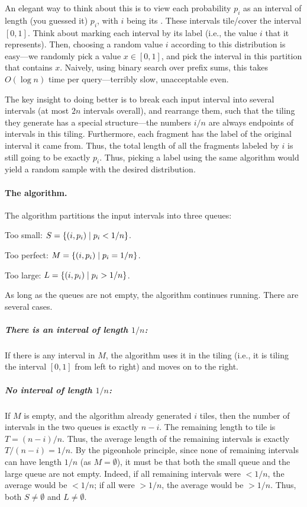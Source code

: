 An elegant way to think about this is to view each probability $p_i$ as
an interval of length (you guessed it) $p_i$, with $i$ being its
.  These intervals tile/cover the interval $[0,1]$. Think
about marking each interval by its label (i.e., the value $i$ that it
represents). Then, choosing a random value $i$ according to this
distribution is easy---we randomly pick a value $x \in [0,1]$, and pick the
interval in this partition that contains $x$. Naively, using binary
search over prefix sums, this takes $O( \log n)$ time per query---terribly
slow, unacceptable even.

The key insight to doing better is to break each input interval into
several intervals (at most $2n$ intervals overall), and rearrange them,
such that the tiling they generate has a special structure---the numbers
$i/n$ are always endpoints of intervals in this tiling. Furthermore, each
fragment has the label of the original interval it came from. Thus, the
total length of all the fragments labeled by $i$ is still going to be
exactly $p_i$. Thus, picking a label using the same algorithm would yield
a random sample with the desired distribution.

\paragraph*{The algorithm.}

The algorithm partitions the input intervals into three queues:
\smallskip
\begin{compactenumI}
    \item Too small: $S = \left\{ (i,p_i) \;\middle\vert\;  p_i < 1/n \right\}$.

    \smallskip%
    \item Too perfect: $M = \left\{ (i,p_i) \;\middle\vert\;  p_i = 1/n \right\}$.

    \smallskip%
    \item Too large: $L = \left\{ (i,p_i) \;\middle\vert\;  p_i > 1/n \right\}$.
\end{compactenumI}
\medskip%

As long as the queues are not empty, the algorithm continues running.
There are several cases.  \subparagraph*{There is an interval of length
   $1/n$:} If there is any interval in $M$, the algorithm uses it in the
tiling (i.e., it is tiling the interval $[0,1]$ from left to right) and
moves on to the right.

\subparagraph*{No interval of length $1/n$:} If $M$ is empty, and the
algorithm already generated $i$ tiles, then the number of intervals in
the two queues is exactly $n-i$. The remaining length to tile is
$T = (n-i)/n$. Thus, the average length of the remaining intervals is
exactly $T / (n-i) = 1/n$. By the pigeonhole principle, since none of
remaining intervals can have length $1/n$ (as $M = \emptyset$), it must be that
both the small queue and the large queue are not empty. Indeed, if all
remaining intervals were $< 1/n$, the average would be $< 1/n$; if all
were $> 1/n$, the average would be $> 1/n$. Thus, both $S \neq \emptyset$ and
$L \neq \emptyset$.

